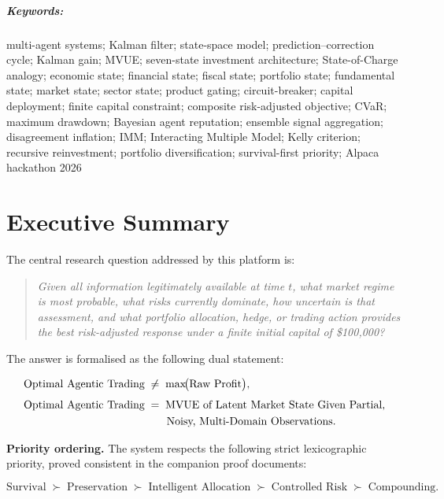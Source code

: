 \documentclass[12pt,openany]{book}
\numberwithin{equation}{chapter}
\theoremstyle{plain}
\theoremstyle{definition}
\theoremstyle{remark}
\newenvironment{keywords}{%
  \paragraph*{Keywords:}
}{}
\begin{document}
\begin{keywords}
multi-agent systems; Kalman filter; state-space model;
prediction--correction cycle; Kalman gain; MVUE;
seven-state investment architecture; State-of-Charge analogy;
economic state; financial state; fiscal state; portfolio state;
fundamental state; market state; sector state; product gating;
circuit-breaker; capital deployment; finite capital constraint;
composite risk-adjusted objective; CVaR; maximum drawdown;
Bayesian agent reputation; ensemble signal aggregation;
disagreement inflation; IMM; Interacting Multiple Model;
Kelly criterion; recursive reinvestment; portfolio diversification;
survival-first priority; Alpaca hackathon 2026
\end{keywords}
\chapter*{Executive Summary}

\noindent
The central research question addressed by this platform is:

\begin{quote}
\emph{Given all information legitimately available at time $t$,
what market regime is most probable, what risks currently
dominate, how uncertain is that assessment, and what portfolio
allocation, hedge, or trading action provides the best
risk-adjusted response under a finite initial capital of
\$100{,}000?}
\end{quote}

\noindent
The answer is formalised as the following dual statement:

\begin{align}
  \text{Optimal Agentic Trading}
    &\;\neq\; \max\!\bigl(\text{Raw Profit}\bigr),
  \label{eq:exec-neq} \\[4pt]
  \text{Optimal Agentic Trading}
    &\;=\; \text{MVUE of Latent Market State Given Partial,}
  \notag \\
    &\qquad \text{Noisy, Multi-Domain Observations.}
  \label{eq:exec-eq}
\end{align}

\noindent
\textbf{Priority ordering.}\enspace
The system respects the following strict lexicographic priority,
proved consistent in the companion proof documents:

\begin{equation}
  \text{Survival} \;\succ\; \text{Preservation}
  \;\succ\; \text{Intelligent Allocation}
  \;\succ\; \text{Controlled Risk}
  \;\succ\; \text{Compounding.}
  \label{eq:priority}
\end{equation}
\end{document}
